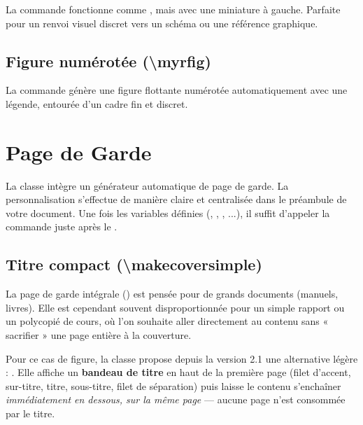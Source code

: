 \documentclass[theme=pringlea]{myrtille}
\begin{document}
La commande  fonctionne comme , mais avec une miniature à gauche. Parfaite pour un renvoi visuel discret vers un schéma ou une référence graphique.


\subsection{Figure numérotée (\textbackslash myrfig)}
La commande  génère une figure flottante numérotée automatiquement avec une légende, entourée d'un cadre fin et discret.


\section{Page de Garde}
La classe intègre un générateur automatique de page de garde. La personnalisation s'effectue de manière claire et centralisée dans le préambule de votre document. Une fois les variables définies (, , , ...), il suffit d'appeler la commande  juste après le .

\subsection{Titre compact (\textbackslash makecoversimple)}
La page de garde intégrale () est pensée pour de grands documents (manuels, livres). Elle est cependant souvent disproportionnée pour un simple rapport ou un polycopié de cours, où l'on souhaite aller directement au contenu sans « sacrifier » une page entière à la couverture.

Pour ce cas de figure, la classe propose depuis la version 2.1 une alternative légère : . Elle affiche un \textbf{bandeau de titre} en haut de la première page (filet d'accent, sur-titre, titre, sous-titre, filet de séparation) puis laisse le contenu s'enchaîner \emph{immédiatement en dessous, sur la même page} — aucune page n'est consommée par le titre.
\end{document}
